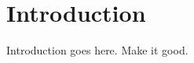 \chapter{Introduction}
\label{cha:introduction}
\label{sec:introduction}
Introduction goes here.  Make it good.

